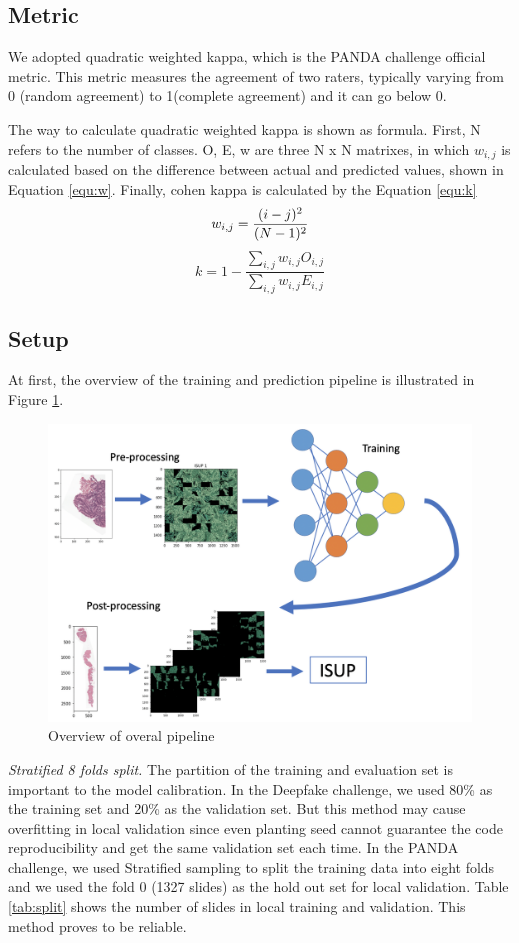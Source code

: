 \documentclass{article}
\begin{document}
\subsection{Metric} We adopted quadratic weighted kappa, which is the PANDA challenge official metric. This metric measures the agreement of two raters, typically varying from 0 (random agreement) to 1(complete agreement) and it can go below 0. \par
The way to calculate quadratic weighted kappa is shown as formula. First, N refers to the number of classes. O, E, w are three N x N matrixes, in which $w_{i,j}$ is calculated based on the difference between actual and predicted values, shown in Equation \ref{equ:w}. Finally, cohen kappa is calculated by the Equation \ref{equ:k}
\begin{equation}
w_{i,j} = \frac{(i-j)^2}{(N-1)^2} \\
\label{equ:w}
\end{equation}
\begin{equation}
k = 1 - \frac{\sum_{i,j}w_{i,j}O_{i,j}}{\sum_{i,j}w_{i,j}E_{i,j}}
\label{equ:k}
\end{equation}




\subsection{Setup}
At first, the overview of the training and prediction pipeline is illustrated in Figure \ref{fig:pipe}. \par

\begin{figure}[!htb]
\centering
\includegraphics[width=0.6\linewidth]{pipeline.png}
\caption{Overview of overal pipeline}
\label{fig:pipe}
\end{figure}


\textit{Stratified 8 folds split.} The partition of the training and evaluation set is important to the model calibration. In the Deepfake challenge, we used 80\% as the training set and 20\% as the validation set. But this method may cause overfitting in local validation since even planting seed cannot guarantee the code reproducibility and get the same validation set each time. In the PANDA challenge, we used Stratified sampling to split the training data into eight folds and we used the fold 0 (1327 slides) as the hold out set for local validation. Table \ref{tab:split} shows the number of slides in local training and validation. This method proves to be reliable. 
\end{document}
